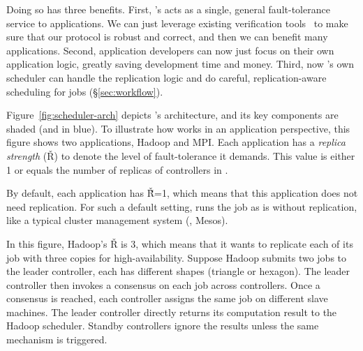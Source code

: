 Doing so has three benefits. First, \tripod's \paxos acts as a single, general 
fault-tolerance service to applications. We can just leverage existing 
verification tools~\cite{modist:nsdi09,demeter:sosp11} to make sure that our 
\falcon protocol is robust and correct, and then we can benefit many 
applications. Second, application developers can now just focus on their own 
application logic, greatly saving development time and money. Third, now 
\tripod's own scheduler can handle the replication logic and do careful, 
replication-aware scheduling for jobs  (\S\ref{sec:workflow}). 






Figure~\ref{fig:scheduler-arch} depicts \tripod's architecture, and its key 
components are shaded (and in blue). To illustrate how \tripod works in an 
application perspective, this figure shows two applications, Hadoop and MPI. 
Each application has a \emph{replica strength} (\v{R}) to denote the level of 
fault-tolerance it demands. This value is either 1 or equals the number of 
replicas of controllers in \tripod.

By default, each application has \v{\v{R}=1}, which means that this application 
does not need replication. For such a default setting, \tripod runs the job as 
is without replication, like a typical cluster management system (\eg, Mesos).

In this figure, Hadoop's \v{R} is 3, which means that it wants to replicate 
each of its job with three copies for high-availability. Suppose Hadoop 
submits two jobs to the leader controller, each has different shapes (triangle 
or hexagon). The leader controller then invokes a consensus on each job across 
controllers. Once a consensus is reached, each controller assigns the same job 
on different slave machines. The leader controller directly returns its 
computation result to the Hadoop scheduler. Standby controllers ignore the 
results unless the same mechanism is triggered.

